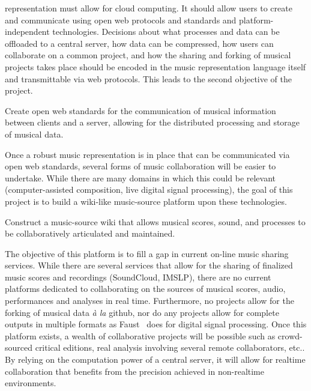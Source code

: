 \documentclass{article}
\begin{document}
representation must allow for cloud computing. It should allow users to
create and communicate using open web protocols and standards and platform-independent
technologies. Decisions about what processes and data can be offloaded to a
central server, how data can be compressed, how users can collaborate on a
common project, and how the sharing and forking of musical projects takes
place should be encoded in the music representation language itself and
transmittable via web protocols. This leads to the second objective of the
project.
\begin{objective}
Create open web standards for the communication of musical
information between clients and a server, allowing for the distributed
processing and storage of musical data.
\end{objective}
Once a robust music representation is in place that can be communicated via
open web standards, several forms of music collaboration will be easier to
undertake. While there are many domains in which this could be relevant
(computer-assisted composition, live digital signal processing), the goal of
this project is to build a wiki-like music-source platform upon
these technologies.  
\begin{objective}
Construct a music-source wiki that allows musical scores, sound, and
processes to be collaboratively articulated and maintained.
\end{objective}
The objective of this platform is to fill a gap in
current on-line music sharing services. While there are several services
that allow for the sharing of finalized music scores and recordings (SoundCloud,
IMSLP), there are no current platforms dedicated to collaborating on
the sources of musical scores, audio, performances and analyses in real time.
Furthermore,
no projects allow for the forking of musical data \emph{\`a la} github, nor
do any projects allow for complete outputs in multiple formats as
Faust~\cite{orlarey2009faust} does
for digital signal processing.  Once this platform exists, a wealth of
collaborative projects will be possible such as crowd-sourced critical
editions, real analysis involving several remote collaborators, etc.. By
relying on the computation power of a central server, it will allow for
realtime collaboration that benefits from the precision achieved in
non-realtime environments.
\end{document}
